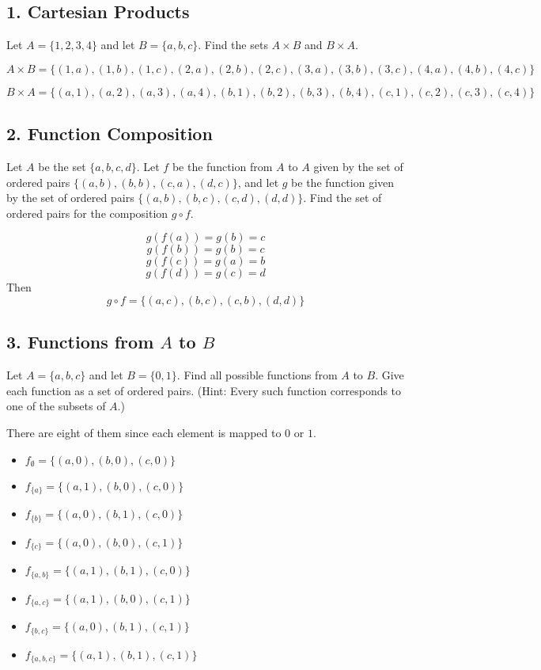 \documentclass{article}
\begin{document}
\subsection*{1. Cartesian Products}

Let $A = \{1,2,3,4\}$ and let $B = \{a, b, c\}$. Find the sets $A \times B$ and $B \times A$.

\[
A \times B = \{(1, a), (1, b), (1, c), (2, a), (2, b), (2, c), (3, a), (3, b), (3, c), (4, a), (4, b), (4, c)\}
\]

\[
B \times A = \{(a, 1), (a, 2), (a, 3), (a, 4), (b, 1), (b, 2), (b, 3), (b, 4), (c, 1), (c, 2), (c, 3), (c, 4)\}
\]

\subsection*{2. Function Composition}

Let $A$ be the set $\{a, b, c, d\}$. Let $f$ be the function from $A$ to $A$ given by the set of ordered pairs $\{(a, b), (b, b), (c, a), (d, c)\}$, and let $g$ be the function given by the set of ordered pairs $\{(a, b), (b, c), (c, d), (d, d)\}$. Find the set of ordered pairs for the composition $g \circ f$.

\[g(f(a)) = g(b) = c\]
\[g(f(b)) = g(b) = c\]
\[g(f(c)) = g(a) = b \]
\[g(f(d)) = g(c) = d \]
Then
\[g \circ f = \{(a, c), (b, c), (c, b), (d, d)\}\]


\subsection*{3. Functions from $A$ to $B$}

Let $A = \{a, b, c\}$ and let $B = \{0, 1\}$. Find all possible functions from $A$ to $B$. Give each function as a set of ordered pairs. (Hint: Every such function corresponds to one of the subsets of $A$.)

There are eight of them since each element is mapped to $0$ or $1$.

\begin{itemize}
    \item \( f_{\emptyset} = \{(a, 0), (b, 0), (c, 0)\} \)
    \item \( f_{\{a\}} = \{(a, 1), (b, 0), (c, 0)\} \)
    \item \( f_{\{b\}} = \{(a, 0), (b, 1), (c, 0)\} \)
    \item \( f_{\{c\}} = \{(a, 0), (b, 0), (c, 1)\} \)
    \item \( f_{\{a, b\}} = \{(a, 1), (b, 1), (c, 0)\} \)
    \item \( f_{\{a, c\}} = \{(a, 1), (b, 0), (c, 1)\} \)
    \item \( f_{\{b, c\}} = \{(a, 0), (b, 1), (c, 1)\} \)
    \item \( f_{\{a, b, c\}} = \{(a, 1), (b, 1), (c, 1)\} \)
\end{itemize}
\end{document}
